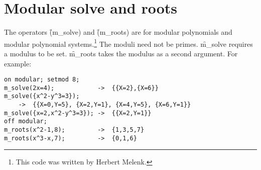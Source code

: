 \section{Modular solve and roots}

\hypertarget{operator:M_SOLVE}{}
\hypertarget{operator:M_ROOTS}{}
The operators \f(m\_solve) and \f(m\_roots) are for
modular polynomials and modular polynomial systems.\footnote{This code was written by Herbert Melenk.}  The moduli need not
be primes. \f{m\_solve} requires a modulus to be set.  \f{m\_roots} takes the
modulus as a second argument. For example:

\begin{verbatim}
on modular; setmod 8;
m_solve(2x=4);            ->  {{X=2},{X=6}}
m_solve({x^2-y^3=3});
    ->  {{X=0,Y=5}, {X=2,Y=1}, {X=4,Y=5}, {X=6,Y=1}}
m_solve({x=2,x^2-y^3=3}); ->  {{X=2,Y=1}}
off modular;
m_roots(x^2-1,8);         ->  {1,3,5,7}
m_roots(x^3-x,7);         ->  {0,1,6}
\end{verbatim}


